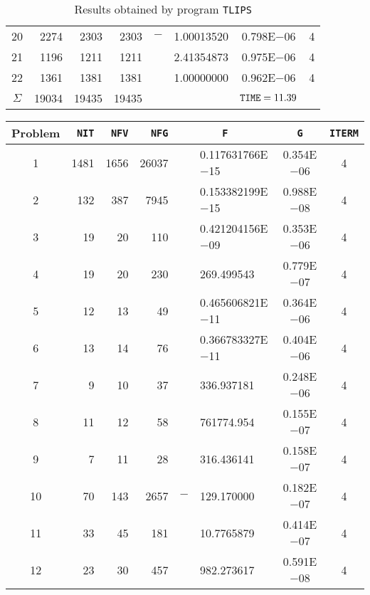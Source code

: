 \documentclass{esub2acm}
\begin{document}
\begin{table}
\begin{tabular}{c|rrrr@{}lcc}
20  &   2274    &   2303    &   2303    &   $-$ &   1.00013520  &   0.798E$-$06 &   4   \\
21  &   1196    &   1211    &   1211    &       &   2.41354873  &   0.975E$-$06 &   4   \\
22  &   1361    &   1381    &   1381    &       &   1.00000000  &   0.962E$-$06 &   4   \\ \hline
$\Sigma$\rule[-2pt]{0pt}{12pt}  &   19034   &   19435   &   19435   &       &       &   ${\tt TIME} = 11.39$    &       \\ \hline
\end{tabular}
\caption{Results obtained by program {\tt TLIPS}}
\label{tlips}
\end{table}

\clearpage

\begin{table}
\footnotesize
\centering
\begin{tabular}{c|rrrr@{}lcc} \hline
Problem\rule[-2pt]{0pt}{12pt}  & {\tt NIT} & {\tt NFV} & {\tt NFG} & \multicolumn{2}{c}{\tt F} & {\tt G} & {\tt ITERM} \\ \hline
1\rule[-2pt]{0pt}{12pt} &   1481    &   1656    &   26037   &       &   0.117631766E$-$15   &   0.354E$-$06 &   4   \\
2   &   132 &   387 &   7945    &       &   0.153382199E$-$15   &   0.988E$-$08 &   4   \\
3   &   19  &   20  &   110 &       &   0.421204156E$-$09   &   0.353E$-$06 &   4   \\
4   &   19  &   20  &   230 &       &   269.499543  &   0.779E$-$07 &   4   \\
5   &   12  &   13  &   49  &       &   0.465606821E$-$11   &   0.364E$-$06 &   4   \\
6   &   13  &   14  &   76  &       &   0.366783327E$-$11   &   0.404E$-$06 &   4   \\
7   &   9   &   10  &   37  &       &   336.937181  &   0.248E$-$06 &   4   \\
8   &   11  &   12  &   58  &       &   761774.954  &   0.155E$-$07 &   4   \\
9   &   7   &   11  &   28  &       &   316.436141  &   0.158E$-$07 &   4   \\
10  &   70  &   143 &   2657    &   $-$ &   129.170000  &   0.182E$-$07 &   4   \\
11  &   33  &   45  &   181 &       &   10.7765879  &   0.414E$-$07 &   4   \\
12  &   23  &   30  &   457 &       &   982.273617  &   0.591E$-$08 &   4   \\

\end{tabular}
\end{table}
\end{document}
